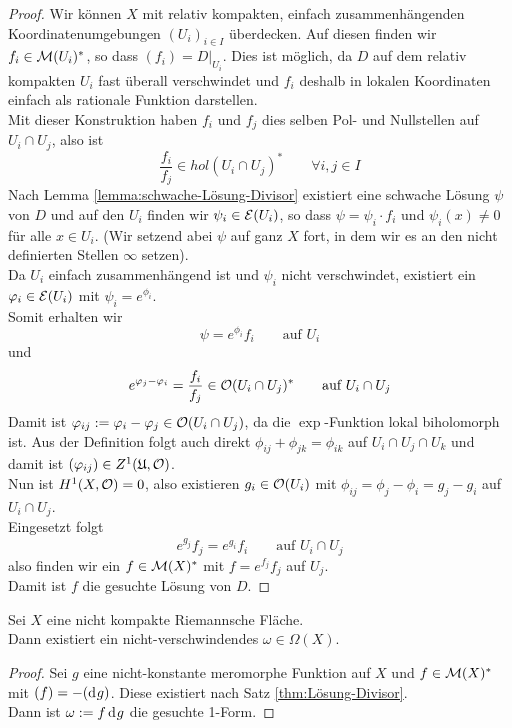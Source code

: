 \begin{proof}
  Wir können $X$ mit relativ kompakten, einfach zusammenhängenden
  Koordinatenumgebungen $(U_i)_{i \in I}$ überdecken. Auf diesen
  finden wir $f_i \in \mathcal{M}(U_i)^\ast$, so dass $(f_i) =
  D|_{U_i}$. Dies ist möglich, da $D$ auf dem relativ kompakten $U_i$
  fast überall verschwindet und $f_i$ deshalb in lokalen Koordinaten
  einfach als rationale Funktion darstellen.\\
  Mit dieser Konstruktion haben $f_i$ und $f_j$ dies selben Pol- und
  Nullstellen auf $U_i \cap U_j$, also ist
  \[
  \frac{f_i}{f_j} \in hol(U_i \cap U_j)^\ast \qquad \forall i,j \in I
  \]
  Nach Lemma \ref{lemma:schwache-Lösung-Divisor} existiert eine
  schwache Lösung $\psi$ von $D$ und auf den $U_i$ finden wir $\psi_i
  \in \mathcal{E}(U_i)$, so dass $\psi = \psi_i \cdot f_i$ und $\psi_i(x)
  \neq 0$ für alle $x \in U_i$. (Wir setzend abei $\psi$ auf ganz $X$
  fort, in dem wir es an den nicht definierten Stellen $\infty$
  setzen). \\
  Da $U_i$ einfach zusammenhängend ist und $\psi_i$ nicht
  verschwindet, existiert ein $\varphi_i \in \mathcal{E}(U_i)$ mit $\psi_i =
  e^{\phi_i}$. \\
  Somit erhalten wir
  \[
  \psi = e^{\phi_i} f_i \qquad \text{auf } U_i
  \]
  und
  \[
  e^{\varphi_j - \varphi_i} = \frac{f_i}{f_j} \in \mathcal{O}(U_i \cap U_j)^\ast
  \qquad \text{auf } U_i \cap U_j
  \]
  Damit ist $\varphi_{ij} := \varphi_i - \varphi_j \in \mathcal{O}(U_i \cap U_j)$, da
  die $\exp$-Funktion lokal biholomorph ist. Aus der Definition folgt
  auch direkt $\phi_{ij} + \phi_{jk} = \phi_{ik}$ auf $U_i \cap U_j
  \cap U_k$ und damit ist $(\varphi_{ij}) \in Z^1(\mathfrak{U}, \mathcal{O})$. \\
  Nun ist $H^1(X, \mathcal{O}) = 0$, also existieren $g_i \in \mathcal{O}(U_i)$ mit
  $\phi_{ij} = \phi_j - \phi_i = g_j - g_i$ auf $U_i \cap U_j$. \\
  Eingesetzt folgt
  \[
  e^{g_j} f_j = e^{g_i} f_i \qquad \text{auf } U_i \cap U_j
  \]
  also finden wir ein $f \in \mathcal{M}(X)^\ast$ mit $f = e^{f_j} f_j$ auf
  $U_j$. \\
  Damit ist $f$ die gesuchte Lösung von $D$.
\end{proof}

\begin{cor}
  \label{cor:nicht-verschwindende-1-form}
  Sei $X$ eine nicht kompakte Riemannsche Fläche. \\
  Dann existiert ein nicht-verschwindendes $\omega \in \Omega(X)$.
\end{cor}

\begin{proof}
  Sei $g$ eine nicht-konstante meromorphe Funktion auf $X$ und $f \in
  \mathcal{M}(X)^\ast$ mit $(f) = -(\d[g])$. Diese existiert nach Satz
  \ref{thm:Lösung-Divisor}.\\
  Dann ist $\omega := f \d[g]$ die gesuchte 1-Form.
\end{proof}






